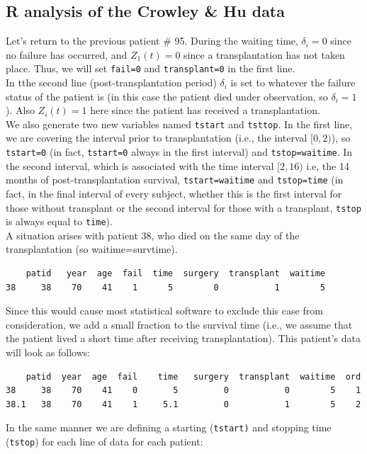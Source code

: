 \documentclass[10pt]{book}
\begin{document}
\subsection{R analysis of the Crowley \& Hu data}
Let's return to  the previous patient \# 95. During the waiting time, $\delta_i=0$ since no failure has occurred, and $Z_1(t)=0$ since a transplantation has not taken place. Thus, we will set {\tt fail=0} and {\tt transplant=0} in the first line.
\\[2ex]
In tthe second line (post-transplantation period) $\delta_i$ is set to whatever the failure status of the patient is (in this case the patient died under observation, so $\delta_i=1$).  Also $Z_i(t)=1$ here since the patient has received a transplantation.
\\[2ex]
We also generate two new variables named {\tt tstart} and {\tt tsttop}. In the first line, we are covering the interval prior to transplantation (i.e., the interval $[0,2)$), so {\tt tstart=0} (in fact, {\tt tstart=0} always in the first interval) and {\tt tstop=waitime}.  In the second interval, which is associated with the time interval $[2,16)$ i.e, the 14 months of post-transplantation survival, {\tt tstart=waitime} and {\tt tstop=time} (in fact, in the final interval of every subject, whether this is the first interval for those without transplant or the second interval for those with a transplant, {\tt tstop} is always equal to {\tt time}).\\[2ex]
A situation arises with patient 38, who died on the same day of the transplantation (so \textsf{waitime}=\textsf{survtime}).
\small
\begin{verbatim}
    patid   year  age  fail  time  surgery  transplant  waitime  
38     38    70    41    1      5        0           1        5  
\end{verbatim}
\normalsize
Since this would cause most statistical software to exclude this case from consideration, we add a small fraction to the survival time (i.e., we assume that the patient lived a short time after receiving transplantation).  This patient's data will look as follows:
\small
\begin{verbatim}
    patid  year  age  fail    time   surgery  transplant  waitime  ord
38     38    70    41    0       5         0           0        5    1
38.1   38    70    41    1     5.1         0           1        5    2
\end{verbatim}
\normalsize
In the same manner we are defining a starting ({\tt tstart)} and stopping time ({\tt tstop}) for each line of data for each patient:
\end{document}
